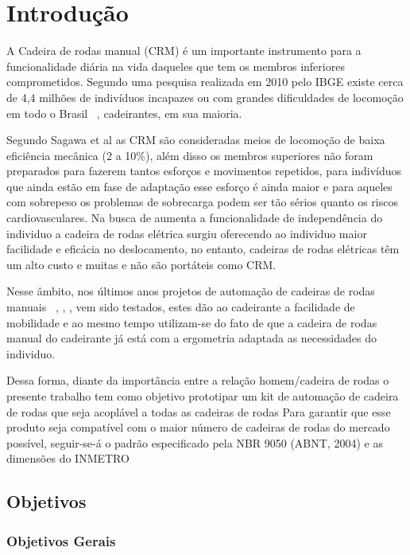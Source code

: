 \chapter[Introdução]{Introdução}

A Cadeira de rodas manual (CRM) é um importante instrumento para a funcionalidade diária na vida daqueles que tem os membros inferiores comprometidos. Segundo uma pesquisa realizada em 2010 pelo IBGE existe cerca de 4,4 milhões de indivíduos incapazes ou com grandes dificuldades de locomoção em todo o Brasil ~\cite{ibge:cartilha:2010}, cadeirantes, em sua maioria.

Segundo Sagawa et al  as CRM são consideradas meios de locomoção de baixa eficiência mecânica (2 a 10\%), além disso os membros superiores não foram preparados para fazerem tantos esforços e movimentos repetidos,  para indivíduos que ainda estão em fase de adaptação esse esforço é ainda maior e para aqueles com sobrepeso os problemas de sobrecarga podem ser tão sérios quanto os riscos cardiovasculares.
Na busca de aumenta a funcionalidade de independência do individuo a cadeira de rodas elétrica surgiu oferecendo ao individuo maior facilidade e eficácia no deslocamento, no entanto, cadeiras de rodas elétricas têm um alto custo e muitas e não são portáteis como CRM.

Nesse âmbito, nos últimos anos projetos de automação de cadeiras de rodas manuais ~\cite{brunel:wheelchair:2004}, \cite{artigo_rudi}, \cite{patent_cadeira_rodas_eletrica},	 \cite{marcos:controle:2002}  vem sido testados, estes dão ao cadeirante a facilidade de mobilidade  e ao mesmo tempo utilizam-se do fato de que a cadeira de rodas manual do cadeirante já está com a ergometria  adaptada as necessidades do individuo.

Dessa forma, diante da importância entre a relação homem/cadeira de rodas o presente trabalho tem como objetivo prototipar um kit de automação de cadeira de rodas que seja acoplável a todas as cadeiras de rodas  Para garantir que esse produto seja compatível com o maior número de cadeiras de rodas do mercado possível, seguir-se-á o padrão especificado pela NBR 9050 (ABNT, 2004) e as dimensões do INMETRO~\cite{inmetro}

\section{Objetivos}
\subsection{Objetivos Gerais}

